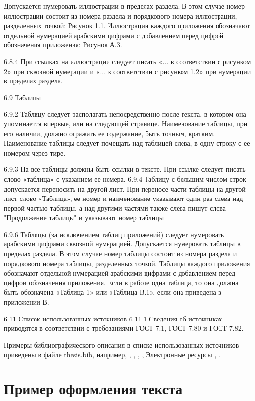 \documentclass[bachelor, och, coursework, times]{SCWorks}
\begin{document}
Допускается нумеровать иллюстрации в пределах раздела. В этом случае
номер иллюстрации состоит из номера раздела и порядкового номера иллюстрации, разделенных точкой: Рисунок 1.1.
Иллюстрации каждого приложения обозначают отдельной нумерацией арабскими цифрами с добавлением перед цифрой обозначения приложения: Рисунок
А.3.

6.8.4 При ссылках на иллюстрации следует писать «... в соответствии с
рисунком 2» при сквозной нумерации и «... в соответствии с рисунком 1.2» при
нумерации в пределах раздела.

6.9 Таблицы

6.9.2 Таблицу следует располагать непосредственно после текста, в котором
она упоминается впервые, или на следующей странице.
Наименование таблицы, при его наличии, должно отражать ее содержание,
быть точным, кратким.
Наименование таблицы следует помещать над таблицей слева, в одну строку
с ее номером через тире.

6.9.3 На все таблицы должны быть ссылки в тексте. При ссылке следует
писать слово «таблица» с указанием ее номера.
6.9.4 Таблицу с большим числом строк допускается переносить на другой
лист. При переносе части таблицы на другой лист слово «Таблица», ее номер и
наименование указывают один раз слева над первой частью таблицы, а над
другими частями также слева пишут слова "Продолжение таблицы" и указывают
номер таблицы


6.9.6 Таблицы (за исключением таблиц приложений) следует нумеровать
арабскими цифрами сквозной нумерацией.
Допускается нумеровать таблицы в пределах раздела. В этом случае номер
таблицы состоит из номера раздела и порядкового номера таблицы, разделенных
точкой.
Таблицы каждого приложения обозначают отдельной нумерацией арабскими
цифрами с добавлением перед цифрой обозначения приложения.
Если в работе одна таблица, то она должна быть обозначена «Таблица 1»
или «Таблица B.1», если она приведена в приложении В.


6.11 Список использованных источников
6.11.1 Сведения об источниках приводятся в соответствии с требованиями
ГОСТ 7.1, ГОСТ 7.80 и ГОСТ 7.82.

Примеры библиографического описания в списке использованных источников
приведены в файле thesis.bib, например,
 \cite{Bari_Stechkin-1956}, \cite{Bari-1955}, \cite{Volosivez-2007},  \cite{Golubov_Efimov_Skvorzov},
Электронные ресурсы \cite{MSDN}, \cite{Wiki}.


 
\section{Пример оформления текста}
\end{document}
